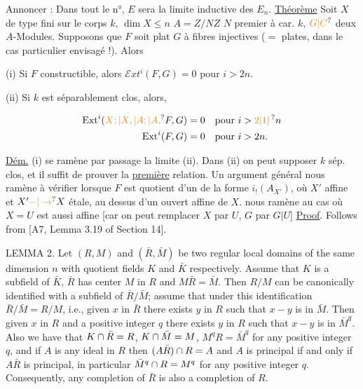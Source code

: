 Annoncer : Dans tout le n°, $E$ sera la limite inductive des $E_n$.
\uline{Théorème}  Soit $X$  de type fini sur le corps $k$, $\dim X\leq n$ $A=Z/NZ$ $N$ premier à car. $k$,   $\unsure{G|C}$ deux $A$-Modules. Supposons que $F$ soit plat  $G$ à fibres injectives ($=$ plates, dans le cas particulier envisagé !). Alors

(i) Si $F$ constructible, alors $\mathscr{E}xt^i(F,G)=0$ pour $i>2n$.

(ii) Si $k$ est séparablement clos, alors, 

\[
\begin{aligned}
\mathrm{Ext}^i(\unsure{X;|X,|A;|A,}F,G)&=0 &&\text{pour } i>\unsure{2|1|\,}n\\
\mathrm{Ext}^i(F,G)&=0 &&\text{pour } i>2n.
\end{aligned}
\]

\uline{Dém.} (i) se ramène par passage  la limite  (ii). Dans (ii) on peut supposer $k$ sép. clos, et  il suffit de prouver la \uline{première} relation.  Un argument général nous ramène à  vérifier  lorsque $F$ est quotient d'un  de la forme $i_!(A_{X'})$, où $X'$ affine et $X'\unsure{-|\to}X$ étale, au dessus d'un ouvert affine  de $X$.  nous ramène au cas où $X=U$ est aussi affine [car on peut remplacer $X$ par $U$, $G$ par $G|U$]
\uline{Proof}. Follows from [A7, Lemma 3.19 of Section 14].

LEMMA 2. Let $(R,M)$ and $(\bar R,\bar M)$ be two regular local domains of the same dimension $n$ with quotient fields $K$ and $\bar K$ respectively. Assume that $K$ is a subfield of $\bar K$, $\bar R$ has center $M$ in $R$ and $M\bar R=\bar M$. Then $R/M$ can be canonically identified with a subfield of $\bar R/\bar M$; assume that under this identification $\bar R/\bar M=R/M$, i.e., given $x$ in $\bar R$ there exists $y$ in $R$ such that $x-y$ is in $\bar M$. Then given $x$ in $R$ and a positive integer $q$ there exists $y$ in $R$ such that $x-y$ is in $\bar M^q$. Also we have that $K\cap\bar R=R$, $K\cap\bar M=M$, $M^qR=\bar M^q$ for any positive integer $q$, and if $A$ is any ideal in $R$ then $(A\bar R)\cap R=A$ and $A$ is principal if and only if $A\bar R$ is principal, in particular $\bar M^q\cap R=M^q$ for any positive integer $q$. Consequently, any completion of $\bar R$ is also a completion of $R$.

